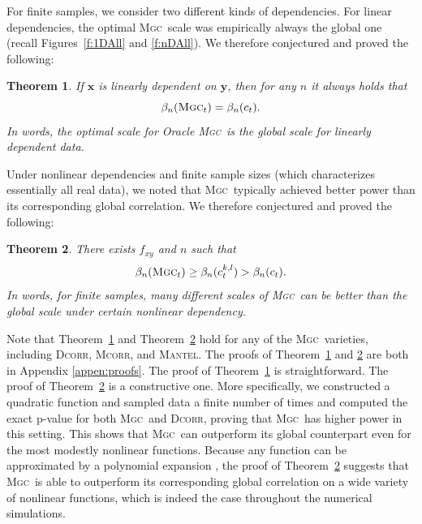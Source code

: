 \documentclass[11pt]{article}
\providecommand{\sct}[1]{{\normalfont\textsc{#1}}}
\providecommand{\mb}[1]{\boldsymbol{#1}}
\newcommand{\G}{c}
\newcommand{\Mgc}{\sct{Mgc}}
\newcommand{\Dcorr}{\sct{Dcorr}}
\newcommand{\Mcorr}{\sct{Mcorr}}
\newcommand{\Mantel}{\sct{Mantel}}
\newtheorem{thm}{Theorem}
\begin{document}
% 
For finite samples, we consider two different kinds of dependencies.
For linear dependencies,  the optimal \Mgc~scale was empirically always the global one (recall Figures~\ref{f:1DAll} and \ref{f:nDAll}). We therefore conjectured and proved the following:
\begin{thm}
\label{t:linear}
If $\mb{x}$ is linearly dependent on $\mb{y}$, then for any $n$ it always holds that
\begin{equation}
\beta_n(\Mgc_t) = \beta_n(\G_t).
\end{equation}
In words, the optimal scale for Oracle \Mgc~is the global scale for linearly dependent data.
\end{thm}

Under nonlinear dependencies and finite sample sizes (which characterizes essentially all real data), we noted that \Mgc~typically achieved better power than its corresponding global correlation. 
We therefore conjectured and proved the following:
\begin{thm}
\label{t:non}
There exists $f_{xy}$ and $n$ such that
\begin{equation}
\beta_n(\Mgc_{t}) \geq \beta_n(\G^{k,l}_{t}) > \beta_n(\G_{t}).
\end{equation}
In words, for finite samples, many different scales of \Mgc~can be better than the global scale under certain nonlinear dependency.
\end{thm}
Note that Theorem~\ref{t:linear} and Theorem~\ref{t:non} hold for any of the \Mgc~varieties, including  \Dcorr, \Mcorr, and \Mantel.
%
The proofs of Theorem~\ref{t:linear} and \ref{t:non} are both in Appendix \ref{appen:proofs}.  The proof of Theorem~\ref{t:linear} is straightforward.  The proof of Theorem~\ref{t:non} is a constructive one. More specifically, we constructed a quadratic function and sampled data a finite number of times and computed the exact p-value for both \Mgc~and \Dcorr, proving that \Mgc~has higher power in this setting. This shows that \Mgc~can outperform its global counterpart even for the most modestly nonlinear functions.  Because any function can be approximated by a polynomial expansion \cite{RudinBook}, the proof of Theorem~\ref{t:non} suggests that \Mgc~is able to outperform its corresponding global correlation on a wide variety of nonlinear functions, which is indeed the case throughout the numerical simulations. %
\end{document}
